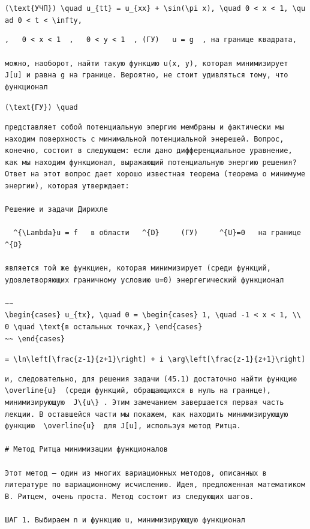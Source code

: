 \documentclass[
  ukrainian,
]{article}
\begin{document}
\texttt{(\textbackslash{}text\{УЧП\})\ \textbackslash{}quad\ u\_\{tt\}\ =\ u\_\{xx\}\ +\ \textbackslash{}sin(\textbackslash{}pi\ x),\ \textbackslash{}quad\ 0\ \textless{}\ x\ \textless{}\ 1,\ \textbackslash{}quad\ 0\ \textless{}\ t\ \textless{}\ \textbackslash{}infty,}

\begin{verbatim}
,   0 < x < 1  ,   0 < y < 1  , (ГУ)   u = g  , на границе квадрата,

можно, наоборот, найти такую функцию u(x, y), которая минимизирует J[u] и равна g на границе. Вероятно, не стоит удивляться тому, что функционал
\end{verbatim}

\texttt{(\textbackslash{}text\{ГУ\})\ \textbackslash{}quad}

\begin{verbatim}
представляет собой потенциальную эпергию мембраны и фактически мы находим поверхность с минимальной потенциальной энерешей. Вопрос, конечно, состоит в следующем: если дано дифференциальное уравнение, как мы находим функционал, выражающий потенциальную энергию решения? Ответ на этот вопрос дает хорошо известная теорема (теорема о минимуме энергии), которая утверждает:

Решение и задачи Дирихле

  ^{\Lambda}u = f   в области   ^{D}     (ГУ)     ^{U}=0   на границе   ^{D} 

является той же функциен, которая минимизирует (среди функций, удовлетворяющих граничному условию u=0) энергегический функционал

~~
\begin{cases} u_{tx}, \quad 0 = \begin{cases} 1, \quad -1 < x < 1, \\ 0 \quad \text{в остальных точках,} \end{cases}
~~ \end{cases}
\end{verbatim}

\texttt{=\ \textbackslash{}ln\textbackslash{}left{[}\textbackslash{}frac\{z-1\}\{z+1\}\textbackslash{}right{]}\ +\ i\ \textbackslash{}arg\textbackslash{}left{[}\textbackslash{}frac\{z-1\}\{z+1\}\textbackslash{}right{]}}

\begin{verbatim}
и, следовательно, для решения задачи (45.1) достаточно найти функцию  \overline{u}  (среди функций, обращающихся в нуль на граннце), минимизирующую  J\{u\} . Этим замечанием завершается первая часть лекции. В оставшейся части мы покажем, как находить минимизирующую функцию  \overline{u}  для J[u], используя метод Ритца.

# Метод Ритца минимизации функционалов

Этот метод — один из многих вариационных методов, описанных в литературе по вариационному исчислению. Идея, предложенная математиком В. Ритцем, очень проста. Метод состоит из следующих шагов.

ШАГ 1. Выбираем n и функцию u, минимизирующую функционал
\end{verbatim}
\end{document}
